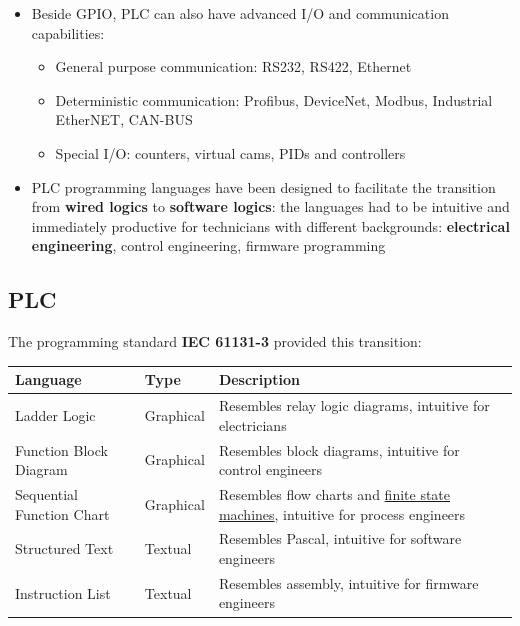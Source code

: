 \documentclass[
  letterpaper,
  DIV=11,
  numbers=noendperiod]{scrartcl}
\newcounter{none} %
\providecommand{\tightlist}{%
  \setlength{\itemsep}{0pt}\setlength{\parskip}{0pt}}
\begin{document}
\begin{itemize}
\tightlist
\item
  Beside GPIO, PLC can also have advanced I/O and communication
  capabilities:

  \begin{itemize}
  \tightlist
  \item
    General purpose communication: RS232, RS422, Ethernet
  \item
    Deterministic communication: Profibus, DeviceNet, Modbus, Industrial
    EtherNET, CAN-BUS
  \item
    Special I/O: counters, virtual cams, PIDs and controllers
  \end{itemize}
\item
  PLC programming languages have been designed to facilitate the
  transition from \textbf{wired logics} to \textbf{software logics}: the
  languages had to be intuitive and immediately productive for
  technicians with different backgrounds: \textbf{electrical
  engineering}, control engineering, firmware programming
\end{itemize}

\subsection{PLC}\label{plc-1}

The programming standard \textbf{IEC 61131-3} provided this transition:

{\def\LTcaptype{none} %
\begin{longtable}[]{@{}
  >{\raggedright\arraybackslash}p{}
  >{\centering\arraybackslash}p{}
  >{\raggedright\arraybackslash}p{}@{}}
\toprule\noalign{}
\begin{minipage}[b]{\linewidth}\raggedright
Language
\end{minipage} & \begin{minipage}[b]{\linewidth}\centering
Type
\end{minipage} & \begin{minipage}[b]{\linewidth}\raggedright
Description
\end{minipage} \\
\midrule\noalign{}
\endhead
\bottomrule\noalign{}
\endlastfoot
Ladder Logic & Graphical & Resembles relay logic diagrams, intuitive for
electricians \\
Function Block Diagram & Graphical & Resembles block diagrams, intuitive
for control engineers \\
Sequential Function Chart & Graphical & Resembles flow charts and
\href{https://en.wikipedia.org/wiki/Finite-state_machine}{finite state
machines}, intuitive for process engineers \\
Structured Text & Textual & Resembles Pascal, intuitive for software
engineers \\
Instruction List & Textual & Resembles assembly, intuitive for firmware
engineers \\
\end{longtable}
}
\end{document}
